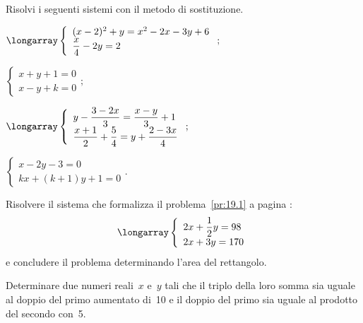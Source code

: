 \begin{esercizio}[\Ast]
 \label{ese:19.13}
Risolvi i seguenti sistemi con il metodo di sostituzione.
 \begin{multicols}{2}
 \begin{enumeratea}
  \item $\longarray\left\{\begin{array}{l}(x-2)^{2}+y=x^{2}-2x-3y+6\\\dfrac{x}{4}-2y=2 \end{array}\right.;$
  \item $\left\{\begin{array}{l}x+y+1=0 \\x-y+k=0 \end{array}\right.;$
\item $\longarray\left\{\begin{array}{l}y-\dfrac{3-2x}{3}=\dfrac{x-y}{3}+1\\\dfrac{x+1}{2}+\dfrac{5}{4}=y+\dfrac{2-3x}{4}\end{array}\right.;$
\item $\left\{\begin{array}{l}x-2y-3=0\\kx+(k+1)y+1=0 \end{array}\right..$
 \end{enumeratea}
 \end{multicols}
\end{esercizio}

\begin{esercizio}
 \label{ese:19.14}
 Risolvere il sistema che formalizza il problema~\ref{pr:19.1} a pagina \pageref{pr:19.1}:
\[\longarray\left\{\begin{array}{l}2x+\dfrac{1}{2}y=98
\\2x+3y=170 \end{array}\right.\]
e concludere il problema determinando l'area del rettangolo.
\end{esercizio}

\begin{esercizio}
 \label{ese:19.15}
Determinare due numeri reali~$x$ e~$y$ tali che il
triplo della loro somma sia uguale al doppio del primo aumentato di~10
e il doppio del primo sia uguale al prodotto del secondo con~5.
 \end{esercizio}

